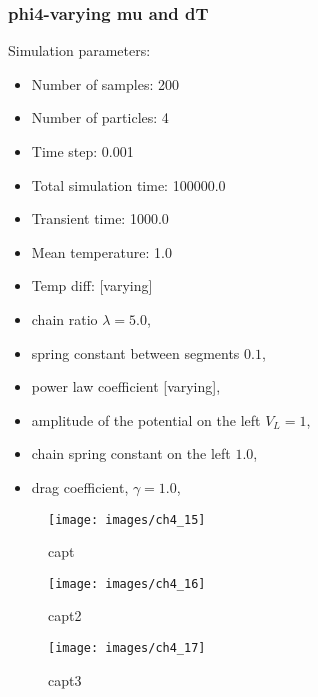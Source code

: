 \subsubsection{phi4-varying mu and dT}
Simulation parameters:
\begin{itemize}
	\item Number of samples: 200
	\item Number of particles: 4
	\item Time step: 0.001
	\item Total simulation time: 100000.0
	\item Transient time: 1000.0
	\item Mean temperature: 1.0
	\item Temp diff: [varying]
	\item chain ratio $ \lambda=5.0 $,
	\item spring constant between segments $ 0.1 $,
	\item power law coefficient [varying],
	\item amplitude of the potential on the left $ V_{L}=1 $,
	\item chain spring constant on the left $ 1.0 $,
	\item drag coefficient, $ \gamma=1.0 $,
\end{itemize}

\begin{figure}[H]
	\centering
	\texttt{[image: images/ch4\_15]}
	\caption{capt}
	\label{fig:ch4_15}
\end{figure}

\begin{figure}[H]
	\centering
	\texttt{[image: images/ch4\_16]}
	\caption{capt2}
	\label{fig:ch4_16}
\end{figure}

\begin{figure}[H]
	\centering
	\texttt{[image: images/ch4\_17]}
	\caption{capt3}
	\label{fig:ch4_17}
\end{figure}


